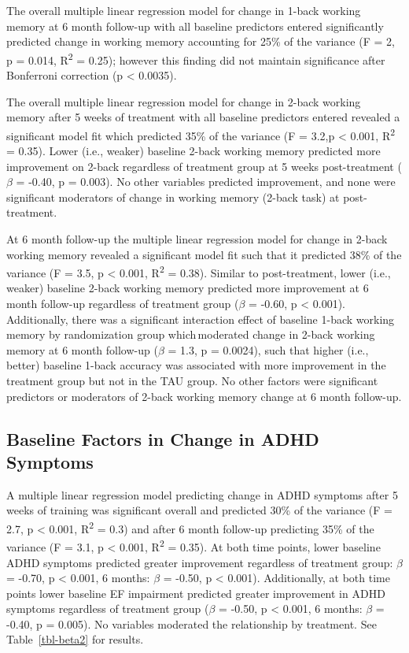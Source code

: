 \documentclass[
  letterpaper,
]{ut-thesis}
\begin{document}
The overall multiple linear regression model for change in 1-back
working memory at 6 month follow-up with all baseline predictors entered
significantly predicted change in working memory accounting for 25\% of
the variance (F = 2, p = 0.014, R\textsuperscript{2} = 0.25); however
this finding did not maintain significance after Bonferroni correction
(p \textless{} 0.0035).

The overall multiple linear regression model for change in 2-back
working memory after 5 weeks of treatment with all baseline predictors
entered revealed a significant model fit which predicted 35\% of the
variance (F = 3.2,p \textless{} 0.001, R\textsuperscript{2} = 0.35).
Lower (i.e., weaker) baseline 2-back working memory predicted more
improvement on 2-back regardless of treatment group at 5 weeks
post-treatment (\(\beta\) = -0.40, p = 0.003). No other variables
predicted improvement, and none were significant moderators of change in
working memory (2-back task) at post-treatment.

At 6 month follow-up the multiple linear regression model for change in
2-back working memory revealed a significant model fit such that it
predicted 38\% of the variance (F = 3.5, p \textless{} 0.001,
R\textsuperscript{2} = 0.38). Similar to post-treatment, lower (i.e.,
weaker) baseline 2-back working memory predicted more improvement at 6
month follow-up regardless of treatment group (\(\beta\) = -0.60, p
\textless{} 0.001). Additionally, there was a significant interaction
effect of baseline 1-back working memory by randomization group
which\,moderated change in 2-back working memory at 6 month follow-up
(\(\beta\) = 1.3, p = 0.0024), such that higher (i.e., better) baseline
1-back accuracy was associated with more improvement in the treatment
group but not in the TAU group. No other factors were significant
predictors or moderators of 2-back working memory change at 6 month
follow-up.

\subsection{Baseline Factors in Change in ADHD
Symptoms}\label{baseline-factors-in-change-in-adhd-symptoms}

A multiple linear regression model predicting change in ADHD symptoms
after 5 weeks of training was significant overall and predicted 30\% of
the variance (F = 2.7, p \textless{} 0.001, R\textsuperscript{2} = 0.3)
and after 6 month follow-up predicting 35\% of the variance (F = 3.1, p
\textless{} 0.001, R\textsuperscript{2} = 0.35). At both time points,
lower baseline ADHD symptoms predicted greater improvement regardless of
treatment group: \(\beta\) = -0.70, p \textless{} 0.001, 6 months:
\(\beta\) = -0.50, p \textless{} 0.001). Additionally, at both time
points lower baseline EF impairment predicted greater improvement in
ADHD symptoms regardless of treatment group (\(\beta\) = -0.50, p
\textless{} 0.001, 6 months: \(\beta\) = -0.40, p = 0.005). No variables
moderated the relationship by treatment. See Table~\ref{tbl-beta2} for
results.
\end{document}

